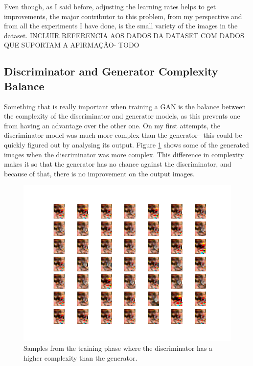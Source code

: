\documentclass[12pt,a4paper,oneside]{memoir}
\begin{document}
\par

Even though, as I said before, adjusting the learning rates helps to get improvements, the major contributor to this problem, from my perspective and from all the experiments I have done, is the small variety of the images in the dataset.  INCLUIR REFERENCIA AOS DADOS DA DATASET COM DADOS QUE SUPORTAM A AFIRMAÇÃO- TODO





\subsection{Discriminator and Generator Complexity Balance}

Something that is really important when training a \acs{GAN} is the balance between the complexity of the discriminator and generator models, as this prevents one from having an advantage over the other one. On my first attempts, the discriminator model was much more complex than the generator-- this could be quickly figured out by analysing its output. Figure \ref{fig:morecomp} shows some of the generated images when the discriminator was more complex. This difference in complexity makes it so that the generator has no chance against the discriminator, and because of that, there is no improvement on the output images.



\begin{figure}[H]
\centering
\includegraphics[width=1\textwidth]{images/more_complex.png}
\caption{Samples from the training phase where the discriminator has a higher complexity than the generator.}
\centering
\label{fig:morecomp}
\end{figure}
 
\end{document}
